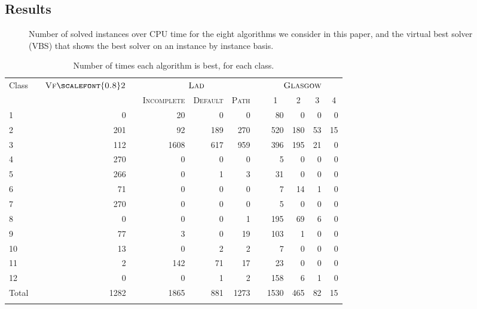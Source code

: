 \documentclass{llncs}
\newcommand{\VFtwo}{$\textsc{Vf{\scalefont{0.8}2}}$\xspace}
\newcommand{\Glasgow}{$\textsc{Glasgow}$\xspace}
\newcommand{\LAD}{$\textsc{Lad}$\xspace}
\begin{document}
\subsection{Results}\label{expComp}

\begin{figure}[p]
    \centering
    \vspace{-0.5cm}

    \caption{Number of solved instances over CPU time for the eight algorithms we
        consider in this paper, and the virtual best solver (VBS) that shows the best
    solver on an instance by instance basis.\label{expTimeGraph}}
\end{figure}

\begin{table}[p]
    \centering\setlength{\tabcolsep}{0.2em}
\begin{tabularx}{.85\textwidth}{XXrXrrrXrrrr}
\toprule
Class && \VFtwo && \multicolumn{3}{c}{\LAD} && \multicolumn{4}{c}{\Glasgow}\\
      &&&&\textsc{Incomplete}&\textsc{Default}&\textsc{Path}&&\multicolumn{1}{c}{\textsc{1}}&\multicolumn{1}{c}{\textsc{2}}&\multicolumn{1}{c}{\textsc{3}}&\multicolumn{1}{c}{\textsc{4}}\\
\midrule
1 &&        0 &&       20 &        0 &        0 &&       80 &        0 &        0 &        0 \\
2 &&      201 &&       92 &      189 &      270 &&      520 &      180 &       53 &       15 \\
3 &&      112 &&     1608 &      617 &      959 &&      396 &      195 &       21 &        0 \\
4 &&      270 &&        0 &        0 &        0 &&        5 &        0 &        0 &        0 \\
5 &&      266 &&        0 &        1 &        3 &&       31 &        0 &        0 &        0 \\
6 &&       71 &&        0 &        0 &        0 &&        7 &       14 &        1 &        0 \\
7 &&      270 &&        0 &        0 &        0 &&        5 &        0 &        0 &        0 \\
8 &&        0 &&        0 &        0 &        1 &&      195 &       69 &        6 &        0 \\
9 &&       77 &&        3 &        0 &       19 &&      103 &        1 &        0 &        0 \\
10 &&       13 &&        0 &        2 &        2 &&        7 &        0 &        0 &        0 \\
11 &&        2 &&      142 &       71 &       17 &&       23 &        0 &        0 &        0 \\
12 &&        0 &&        0 &        1 &        2 &&      158 &        6 &        1 &        0 \\
\midrule
Total && 1282 && 1865 & 881 & 1273 && 1530 & 465 & 82& 15\\
\bottomrule \\
\end{tabularx}
\caption{Number of times each algorithm is best, for each class.\label{expClass}}
\end{table}
\end{document}
